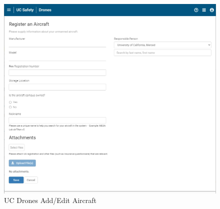 \documentclass[
  12pt,
]{book}
\begin{document}
\begin{figure}

{\centering \includegraphics[width=0.95\linewidth]{images/UCDrones_aircraft} 

}

\caption{UC Drones Add/Edit Aircraft}\label{fig:UCDrones-edit-aircrafts}
\end{figure}
\end{document}
